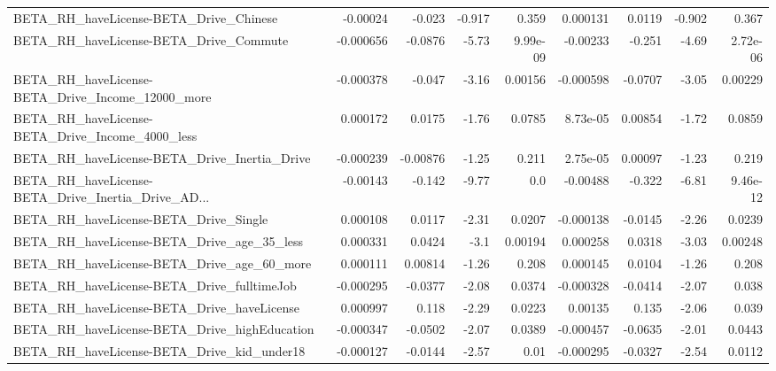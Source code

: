 \begin{tabular}{lrrrrrrrr}
BETA\_RH\_haveLicense-BETA\_Drive\_Chinese             &    -0.00024 &       -0.023 &   -0.917 &    0.359 &   0.000131 &      0.0119 &       -0.902 &         0.367 \\
BETA\_RH\_haveLicense-BETA\_Drive\_Commute             &   -0.000656 &      -0.0876 &    -5.73 & 9.99e-09 &   -0.00233 &      -0.251 &        -4.69 &      2.72e-06 \\
BETA\_RH\_haveLicense-BETA\_Drive\_Income\_12000\_more   &   -0.000378 &       -0.047 &    -3.16 &  0.00156 &  -0.000598 &     -0.0707 &        -3.05 &       0.00229 \\
BETA\_RH\_haveLicense-BETA\_Drive\_Income\_4000\_less    &    0.000172 &       0.0175 &    -1.76 &   0.0785 &   8.73e-05 &     0.00854 &        -1.72 &        0.0859 \\
BETA\_RH\_haveLicense-BETA\_Drive\_Inertia\_Drive       &   -0.000239 &     -0.00876 &    -1.25 &    0.211 &   2.75e-05 &     0.00097 &        -1.23 &         0.219 \\
BETA\_RH\_haveLicense-BETA\_Drive\_Inertia\_Drive\_AD... &    -0.00143 &       -0.142 &    -9.77 &      0.0 &   -0.00488 &      -0.322 &        -6.81 &      9.46e-12 \\
BETA\_RH\_haveLicense-BETA\_Drive\_Single              &    0.000108 &       0.0117 &    -2.31 &   0.0207 &  -0.000138 &     -0.0145 &        -2.26 &        0.0239 \\
BETA\_RH\_haveLicense-BETA\_Drive\_age\_35\_less         &    0.000331 &       0.0424 &     -3.1 &  0.00194 &   0.000258 &      0.0318 &        -3.03 &       0.00248 \\
BETA\_RH\_haveLicense-BETA\_Drive\_age\_60\_more         &    0.000111 &      0.00814 &    -1.26 &    0.208 &   0.000145 &      0.0104 &        -1.26 &         0.208 \\
BETA\_RH\_haveLicense-BETA\_Drive\_fulltimeJob         &   -0.000295 &      -0.0377 &    -2.08 &   0.0374 &  -0.000328 &     -0.0414 &        -2.07 &         0.038 \\
BETA\_RH\_haveLicense-BETA\_Drive\_haveLicense         &    0.000997 &        0.118 &    -2.29 &   0.0223 &    0.00135 &       0.135 &        -2.06 &         0.039 \\
BETA\_RH\_haveLicense-BETA\_Drive\_highEducation       &   -0.000347 &      -0.0502 &    -2.07 &   0.0389 &  -0.000457 &     -0.0635 &        -2.01 &        0.0443 \\
BETA\_RH\_haveLicense-BETA\_Drive\_kid\_under18         &   -0.000127 &      -0.0144 &    -2.57 &     0.01 &  -0.000295 &     -0.0327 &        -2.54 &        0.0112 \\

\end{tabular}
